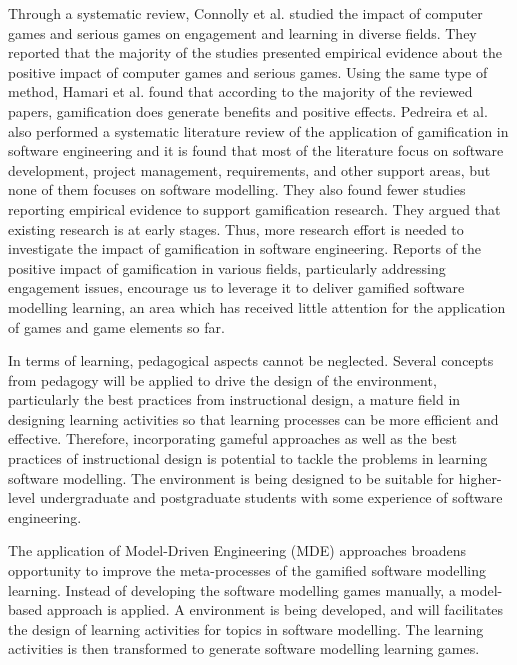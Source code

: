 \documentclass[10pt, a4paper]{report} \usepackage[titletoc]{appendix}
\begin{document}
Through a systematic review, Connolly et al. \cite{connolly2012systematic} studied the impact of computer games and serious games on engagement and learning in diverse fields. They reported that the majority of the studies presented empirical evidence about the positive impact of computer games and serious games. Using the same type of method, Hamari et al. \cite{hamari2014does} found that according to the majority of the reviewed papers, gamification does generate benefits and positive effects. Pedreira et al. \cite{Pedreira2015} also performed a systematic literature review of the application of gamification in software engineering and it is found that most of the literature focus on software development, project management, requirements, and other support areas, but none of them focuses on software modelling. They also found fewer studies reporting empirical evidence to support gamification research. They argued that existing research is at early stages. Thus, more research effort is needed to investigate the impact of gamification in software engineering. Reports of the positive impact of gamification in various fields, particularly addressing engagement issues, encourage us to leverage it to deliver gamified software modelling learning, an area which has received little attention for the application of games and game elements so far. 

In terms of learning, pedagogical aspects cannot be neglected. Several concepts from pedagogy will be applied to drive the design of the environment, particularly the best practices from instructional design, a mature field in designing learning activities so that learning processes can be more efficient and effective. Therefore, incorporating gameful approaches as well as the best practices of instructional design is potential to tackle the problems in learning software modelling. The environment is being designed to be suitable for higher-level undergraduate and postgraduate students with some experience of software engineering. 

The application of Model-Driven Engineering (MDE) approaches broadens opportunity to improve the meta-processes of the gamified software modelling learning. Instead of developing the software modelling games manually, a model-based approach is applied. A environment is being developed, and will facilitates the design of learning activities for topics in software modelling. The learning activities is then transformed to generate software modelling learning games. 
\end{document}
